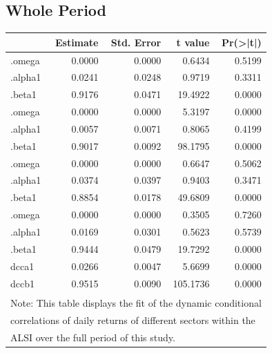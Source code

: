 \documentclass[11pt,preprint, authoryear]{elsarticle}
\let\origtable\table
\let\endorigtable\endtable
\renewenvironment{table}[1][2] {
    \expandafter\origtable\expandafter[H]
} {
    \endorigtable
}
\numberwithin{equation}{section}
\numberwithin{figure}{section}
\numberwithin{table}{section}
\begin{document}
\hypertarget{whole-period}{%
\subsection{Whole Period}\label{whole-period}}

\begin{table}

\caption{\label{tab:dccfitw}..... \label{dccfitw}}
\centering
\fontsize{9}{11}\selectfont
\begin{tabular}[t]{l|r|r|r|r}
\hline
  &  Estimate &  Std. Error &  t value & Pr(>|t|)\\
\hline
[Financials].omega & 0.0000 & 0.0000 & 0.6434 & 0.5199\\
\hline
[Financials].alpha1 & 0.0241 & 0.0248 & 0.9719 & 0.3311\\
\hline
[Financials].beta1 & 0.9176 & 0.0471 & 19.4922 & 0.0000\\
\hline
[Industrials].omega & 0.0000 & 0.0000 & 5.3197 & 0.0000\\
\hline
[Industrials].alpha1 & 0.0057 & 0.0071 & 0.8065 & 0.4199\\
\hline
[Industrials].beta1 & 0.9017 & 0.0092 & 98.1795 & 0.0000\\
\hline
[Property].omega & 0.0000 & 0.0000 & 0.6647 & 0.5062\\
\hline
[Property].alpha1 & 0.0374 & 0.0397 & 0.9403 & 0.3471\\
\hline
[Property].beta1 & 0.8854 & 0.0178 & 49.6809 & 0.0000\\
\hline
[Resources].omega & 0.0000 & 0.0000 & 0.3505 & 0.7260\\
\hline
[Resources].alpha1 & 0.0169 & 0.0301 & 0.5623 & 0.5739\\
\hline
[Resources].beta1 & 0.9444 & 0.0479 & 19.7292 & 0.0000\\
\hline
[Joint]dcca1 & 0.0266 & 0.0047 & 5.6699 & 0.0000\\
\hline
[Joint]dccb1 & 0.9515 & 0.0090 & 105.1736 & 0.0000\\
\hline
\multicolumn{5}{l}{\textsuperscript{} Note: This table displays the fit of the dynamic conditional}\\
\multicolumn{5}{l}{correlations of daily returns of different sectors within the}\\
\multicolumn{5}{l}{ALSI over the full period of this study.}\\
\end{tabular}
\end{table}
\end{document}
